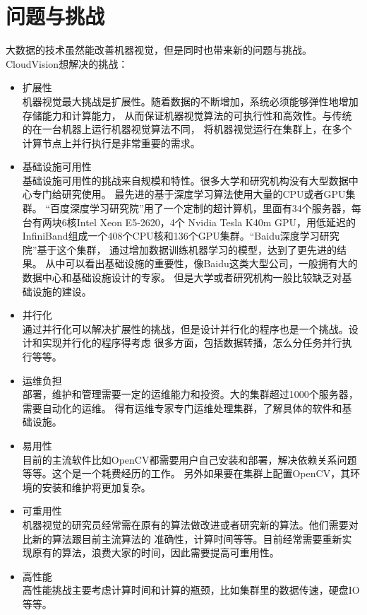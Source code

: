 \section{问题与挑战}
\label{sec:challenges}
大数据的技术虽然能改善机器视觉，但是同时也带来新的问题与挑战。
CloudVision想解决的挑战：
\begin{itemize}
  \item 扩展性 \\
        机器视觉最大挑战是扩展性。随着数据的不断增加，系统必须能够弹性地增加存储能力和计算能力，
        从而保证机器视觉算法的可执行性和高效性。与传统的在一台机器上运行机器视觉算法不同，
        将机器视觉运行在集群上，在多个计算节点上并行执行是非常重要的需求。
  \item 基础设施可用性 \\
        基础设施可用性的挑战来自规模和特性。很多大学和研究机构没有大型数据中心专门给研究使用。
        最先进的基于深度学习算法使用大量的CPU或者GPU集群\cite{googlenet2015, google2015rethinking, baidup2015deepgpu}。
        “百度深度学习研究院”用了一个定制的超计算机，里面有34个服务器，每台有两块6核Intel Xeon E5-2620，4个
        Nvidia Tesla K40m GPU，用低延迟的InfiniBand组成一个408个CPU核和136个GPU集群。“Baidu深度学习研究院”基于这个集群，
        通过增加数据训练机器学习的模型，达到了更先进的结果。\cite{baidup2015deepgpu}
        从中可以看出基础设施的重要性，像Baidu这类大型公司，一般拥有大的数据中心和基础设施设计的专家。
        但是大学或者研究机构一般比较缺乏对基础设施的建设。
  \item 并行化 \\
        通过并行化可以解决扩展性的挑战，但是设计并行化的程序也是一个挑战。设计和实现并行化的程序得考虑
        很多方面，包括数据转播，怎么分任务并行执行等等。
  \item 运维负担 \\
        部署，维护和管理需要一定的运维能力和投资。大的集群超过1000个服务器，需要自动化的运维。
        得有运维专家专门运维处理集群，了解具体的软件和基础设施。
  \item 易用性 \\
        目前的主流软件比如OpenCV都需要用户自己安装和部署，解决依赖关系问题等等。这个是一个耗费经历的工作。
        另外如果要在集群上配置OpenCV，其环境的安装和维护将更加复杂。
  \item 可重用性 \\
        机器视觉的研究员经常需在原有的算法做改进或者研究新的算法。他们需要对比新的算法跟目前主流算法的
        准确性，计算时间等等。目前经常需要重新实现原有的算法，浪费大家的时间，因此需要提高可重用性。
  \item 高性能 \\
        高性能挑战主要考虑计算时间和计算的瓶颈，比如集群里的数据传速，硬盘IO等等。
\end{itemize}


